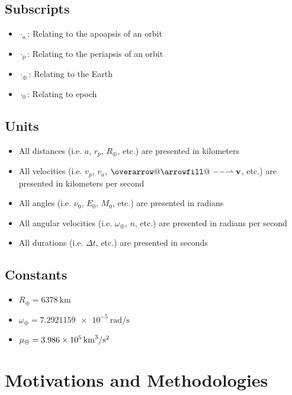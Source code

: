 \documentclass[conference]{IEEEtran}
\makeatletter
\newcommand*{\overrightharpoonup}{\mathpalette{\overarrow@\rightharpoonupfill@}}
\newcommand*{\rightharpoonupfill@}{\arrowfill@\relbar\relbar\rightharpoonup}
\renewcommand{\vec}[1]{\overrightharpoonup{\bm{\mathrm{#1}}}}
\makeatother
\begin{document}
		\subsection{Subscripts}
			\begin{itemize}
				\item \( \cdot_a \): Relating to the apoapsis of an orbit
				\item \( \cdot_p \): Relating to the periapsis of an orbit
				\item \( \cdot_{\oplus} \): Relating to the Earth
				\item \( \cdot_0 \): Relating to epoch
			\end{itemize}

		\subsection{Units}
			\begin{itemize}
				\item All distances (i.e. \( a \), \( r_p \), \( R_{\oplus} \), etc.) are presented in kilometers
				\item All velocities (i.e. \( v_p \), \( v_a \), \( \vec{v} \), etc.) are presented in kilometers per second
				\item All angles (i.e. \( \nu_0 \), \( E_0 \), \( M_0 \), etc.) are presented in radians
				\item All angular velocities (i.e. \( \omega_{\oplus} \), \( n \), etc.) are presented in radians per second
				\item All durations (i.e. \( \Delta t \), etc.) are presented in seconds
			\end{itemize}

		\subsection{Constants}
			\begin{itemize}
				\item \( R_{\oplus}=\qty{6378}{\kilo\meter} \)
				\item \( \omega_{\oplus}=\qty{7.2921159e-5}{\radian\per\second} \)
				\item \( \mu_{\oplus}=\qty{3.986e5}{{\kilo\meter^3}\per{\second^2}} \)
			\end{itemize}

	\section{Motivations and Methodologies}
\end{document}
